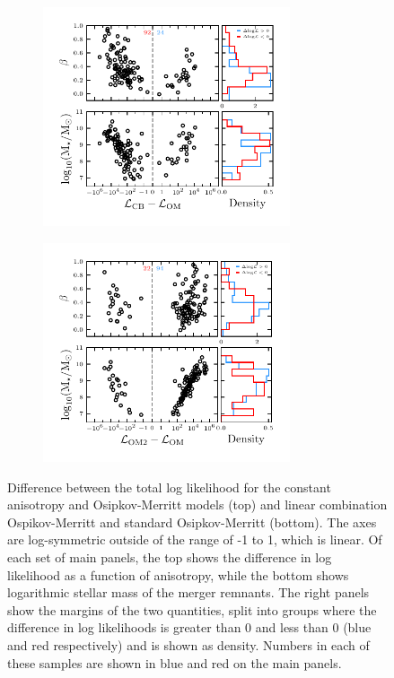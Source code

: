 \begin{figure}
    \centering
    \begin{subfigure}{0.8\textwidth}
        \includegraphics[width=0.8\textwidth]{figure/ch4/loglike_symlog_starmass_beta_comparison_cb_om.pdf}
    \end{subfigure}
    \begin{subfigure}{0.8\textwidth}
        \includegraphics[width=0.8\textwidth]{figure/ch4/loglike_symlog_starmass_beta_comparison_om2_om.pdf}
    \end{subfigure}
    \caption{Difference between the total log likelihood for the constant anisotropy and Osipkov-Merritt models (top) and linear combination Ospikov-Merritt and standard Osipkov-Merritt (bottom). The axes are log-symmetric outside of the range of -1 to 1, which is linear. Of each set of main panels, the top shows the difference in log likelihood as a function of anisotropy, while the bottom shows logarithmic stellar mass of the merger remnants. The right panels show the margins of the two quantities, split into groups where the difference in log likelihoods is greater than 0 and less than 0 (blue and red respectively) and is shown as density. Numbers in each of these samples are shown in blue and red on the main panels.}
    \label{ch4:fig:loglike-diff-beta-starmass}
\end{figure}

